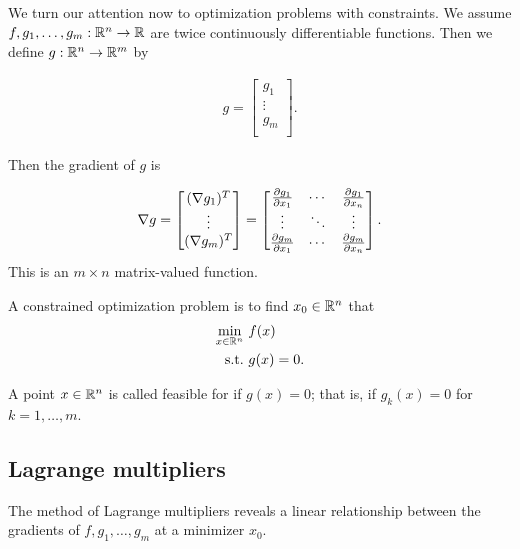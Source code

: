 We turn our attention now to optimization problems with constraints.
We assume $f, g_1, \dots, g_m : \mathbb{R}^n \to \mathbb{R}$ are twice continuously differentiable functions.
Then we define $g:\mathbb{R}^n \to \mathbb{R}^m$ by

\begin{align}
g = \begin{bmatrix}
g_1\\
\vdots\\
g_m\\
\end{bmatrix}.
\end{align}

Then the gradient of $g$ is

\begin{align}
\nabla g = \begin{bmatrix}
(\nabla g_1)^T\\
\vdots\\
(\nabla g_m)^T\\
\end{bmatrix}
= \begin{bmatrix}
\frac{\partial g_1}{\partial x_1} & \cdots & \frac{\partial g_1}{\partial x_n} \\
\vdots & \ddots & \vdots \\
\frac{\partial g_m}{\partial x_1} & \cdots & \frac{\partial g_m}{\partial x_n} \\
\end{bmatrix}.
\end{align}
This is an $m \times n$ matrix-valued function.

\begin{definition}
A constrained optimization problem is to find $x_0 \in \mathbb{R}^n$ that
\begin{align}
\min_{x\in\mathbb{R}^n} \ & f(x) \\
\mathrm{s.t. \ } & g(x) = 0.
\end{align}
\end{definition}

\begin{definition}
A point $x \in \mathbb{R}^n$ is called feasible for if $g(x) = 0$; that is, if $g_k(x) = 0$ for $k = 1, \dots, m$.
\end{definition}

\subsection{Lagrange multipliers}

The method of Lagrange multipliers reveals a linear relationship between the gradients of $f, g_1, \dots, g_m$ at a minimizer $x_0$.

